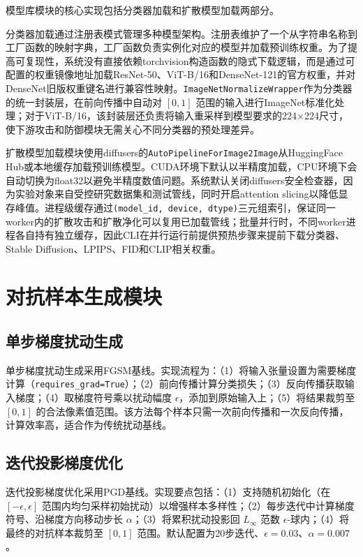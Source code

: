 \documentclass[type=bachelor,oneside]{fduthesis}
\begin{document}
模型库模块的核心实现包括分类器加载和扩散模型加载两部分。

分类器加载通过注册表模式管理多种模型架构。注册表维护了一个从字符串名称到工厂函数的映射字典，工厂函数负责实例化对应的模型并加载预训练权重。为了提高可复现性，系统没有直接依赖torchvision构造函数的隐式下载逻辑，而是通过可配置的权重镜像地址加载ResNet-50\cite{he2016deep}、ViT-B/16\cite{dosovitskiy2021an}和DenseNet-121\cite{huang2017densely}的官方权重，并对DenseNet旧版权重键名进行兼容性映射。\texttt{ImageNetNormalizeWrapper}作为分类器的统一封装层，在前向传播中自动对 $[0,1]$ 范围的输入进行ImageNet标准化处理；对于ViT-B/16，该封装层还负责将输入重采样到模型要求的224$\times$224尺寸，使下游攻击和防御模块无需关心不同分类器的预处理差异。

扩散模型加载模块使用diffusers的\texttt{AutoPipelineForImage2Image}从HuggingFace Hub或本地缓存加载预训练模型。CUDA环境下默认以半精度加载，CPU环境下会自动切换为float32以避免半精度数值问题。系统默认关闭diffusers安全检查器，因为实验对象来自受控研究数据集和测试管线，同时开启attention slicing以降低显存峰值。进程级缓存通过\texttt{(model\_id, device, dtype)}三元组索引，保证同一worker内的扩散攻击和扩散净化可以复用已加载管线；批量并行时，不同worker进程各自持有独立缓存，因此CLI在并行运行前提供预热步骤来提前下载分类器、Stable Diffusion、LPIPS、FID和CLIP相关权重。

\section{对抗样本生成模块}

\subsection{单步梯度扰动生成}

单步梯度扰动生成采用FGSM基线。实现流程为：（1）将输入张量设置为需要梯度计算（\texttt{requires\_grad=True}）；（2）前向传播计算分类损失；（3）反向传播获取输入梯度；（4）取梯度符号乘以扰动幅度 $\epsilon$，添加到原始输入上；（5）将结果裁剪至 $[0,1]$ 的合法像素值范围。该方法每个样本只需一次前向传播和一次反向传播，计算效率高，适合作为传统扰动基线。

\subsection{迭代投影梯度优化}

迭代投影梯度优化采用PGD基线。实现要点包括：（1）支持随机初始化（在 $[-\epsilon, \epsilon]$ 范围内均匀采样初始扰动）以增强样本多样性；（2）每步迭代中计算梯度符号、沿梯度方向移动步长 $\alpha$；（3）将累积扰动投影回 $L_\infty$ 范数 $\epsilon$-球内；（4）将最终的对抗样本裁剪至 $[0,1]$ 范围。默认配置为20步迭代、$\epsilon=0.03$、$\alpha=0.007$。
\end{document}
